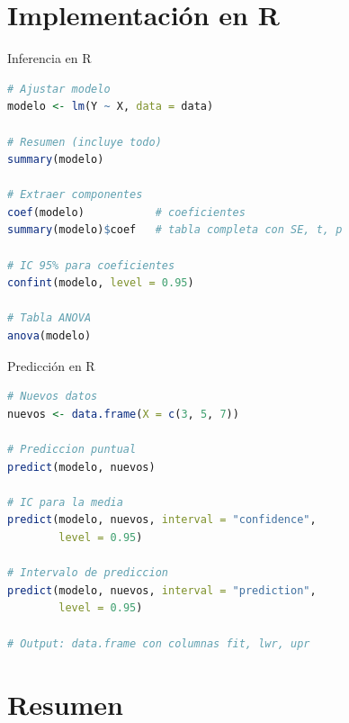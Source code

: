 \documentclass[aspectratio=169]{beamer}
\begin{document}
\section{Implementación en R}

\begin{frame}[fragile]{Inferencia en R}
\begin{lstlisting}[language=R]
# Ajustar modelo
modelo <- lm(Y ~ X, data = data)

# Resumen (incluye todo)
summary(modelo)

# Extraer componentes
coef(modelo)           # coeficientes
summary(modelo)$coef   # tabla completa con SE, t, p

# IC 95% para coeficientes
confint(modelo, level = 0.95)

# Tabla ANOVA
anova(modelo)
\end{lstlisting}
\end{frame}

\begin{frame}[fragile]{Predicción en R}
\begin{lstlisting}[language=R]
# Nuevos datos
nuevos <- data.frame(X = c(3, 5, 7))

# Prediccion puntual
predict(modelo, nuevos)

# IC para la media
predict(modelo, nuevos, interval = "confidence", 
        level = 0.95)

# Intervalo de prediccion
predict(modelo, nuevos, interval = "prediction", 
        level = 0.95)

# Output: data.frame con columnas fit, lwr, upr
\end{lstlisting}
\end{frame}

\section{Resumen}
\end{document}
